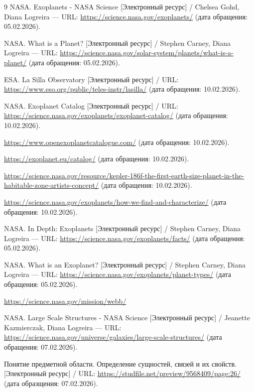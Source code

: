 \documentclass[14pt,a4paper]{extarticle}
\begin{document}
\begin{thebibliography}{9}
		 NASA. Exoplanets - NASA Science [Электронный ресурс] / Chelsea Gohd, Diana Logreira --- URL: \url{https://science.nasa.gov/exoplanets/} (дата обращения: 05.02.2026).
		
		 NASA. What is a Planet? [Электронный ресурс] / Stephen Carney, Diana Logreira --- URL: \url{https://science.nasa.gov/solar-system/planets/what-is-a-planet/} (дата обращения: 05.02.2026).
		
		 ESA. La Silla Observatory [Электронный ресурс] / URL: \url{https://www.eso.org/public/teles-instr/lasilla/} (дата обращения: 10.02.2026).
		
		 NASA. Exoplanet Catalog [Электронный ресурс] / URL: \url{https://science.nasa.gov/exoplanets/exoplanet-catalog/} (дата обращения: 10.02.2026).
		
		 \url{https://www.openexoplanetcatalogue.com/} (дата обращения: 10.02.2026).
		
		 \url{https://exoplanet.eu/catalog/} (дата обращения: 10.02.2026).
		
		 \url{https://science.nasa.gov/resource/kepler-186f-the-first-earth-size-planet-in-the-habitable-zone-artists-concept/} (дата обращения: 10.02.2026).
		
		 \url{https://science.nasa.gov/exoplanets/how-we-find-and-characterize/} (дата обращения: 10.02.2026).
		
		 NASA. In Depth: Exoplanets [Электронный ресурс] / Stephen Carney, Diana Logreira --- URL: \url{https://science.nasa.gov/exoplanets/facts/} (дата обращения: 05.02.2026).
		
		 NASA. What is an Exoplanet? [Электронный ресурс] / Stephen Carney, Diana Logreira --- URL: \url{https://science.nasa.gov/exoplanets/planet-types/} (дата обращения: 05.02.2026).
		
		 \url{https://science.nasa.gov/mission/webb/}
		
		 NASA. Large Scale Structures - NASA Science [Электронный ресурс] / Jeanette Kazmierczak, Diana Logreira --- URL: \url{https://science.nasa.gov/universe/galaxies/large-scale-structures/} (дата обращения: 07.02.2026).
		
		 Понятие предметной области. Определение сущностей, связей и их свойств. [Электронный ресурс] / URL: \url{https://studfile.net/preview/9568409/page:26/} (дата образщения: 07.02.2026).
		

\end{thebibliography}
\end{document}
